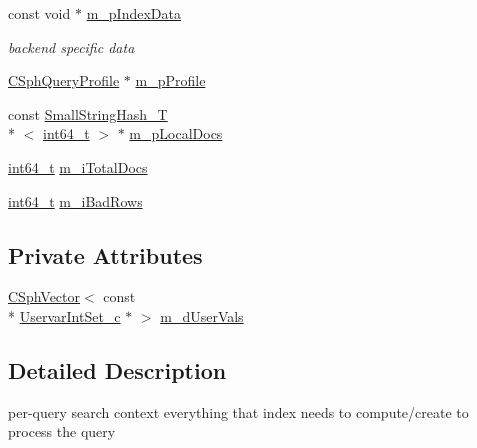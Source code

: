 \begin{DoxyCompactItemize}
\item 
const void $\ast$ \hyperlink{classCSphQueryContext_a57d27f825ca837d923ec7ef70fde7bd2}{m\-\_\-p\-Index\-Data}
\begin{DoxyCompactList}\small\item\em backend specific data \end{DoxyCompactList}\item 
\hyperlink{classCSphQueryProfile}{C\-Sph\-Query\-Profile} $\ast$ \hyperlink{classCSphQueryContext_ae582e104b3365bd7fa9b729acfbca400}{m\-\_\-p\-Profile}
\item 
const \hyperlink{classSmallStringHash__T}{Small\-String\-Hash\-\_\-\-T}\\*
$<$ \hyperlink{sphinxstd_8h_a996e72f71b11a5bb8b3b7b6936b1516d}{int64\-\_\-t} $>$ $\ast$ \hyperlink{classCSphQueryContext_a1a64d73d4c94e6efe7460dbb0881bd2e}{m\-\_\-p\-Local\-Docs}
\item 
\hyperlink{sphinxstd_8h_a996e72f71b11a5bb8b3b7b6936b1516d}{int64\-\_\-t} \hyperlink{classCSphQueryContext_ac04374526c69e45a7bc7a0547e9cb153}{m\-\_\-i\-Total\-Docs}
\item 
\hyperlink{sphinxstd_8h_a996e72f71b11a5bb8b3b7b6936b1516d}{int64\-\_\-t} \hyperlink{classCSphQueryContext_a09e4f76edfe5453c46d72873b694cfff}{m\-\_\-i\-Bad\-Rows}
\end{DoxyCompactItemize}
\subsection*{Private Attributes}
\begin{DoxyCompactItemize}
\item 
\hyperlink{classCSphVector}{C\-Sph\-Vector}$<$ const \\*
\hyperlink{classUservarIntSet__c}{Uservar\-Int\-Set\-\_\-c} $\ast$ $>$ \hyperlink{classCSphQueryContext_a6be62d25efc2df7c6922213d734574c1}{m\-\_\-d\-User\-Vals}
\end{DoxyCompactItemize}


\subsection{Detailed Description}
per-\/query search context everything that index needs to compute/create to process the query 


